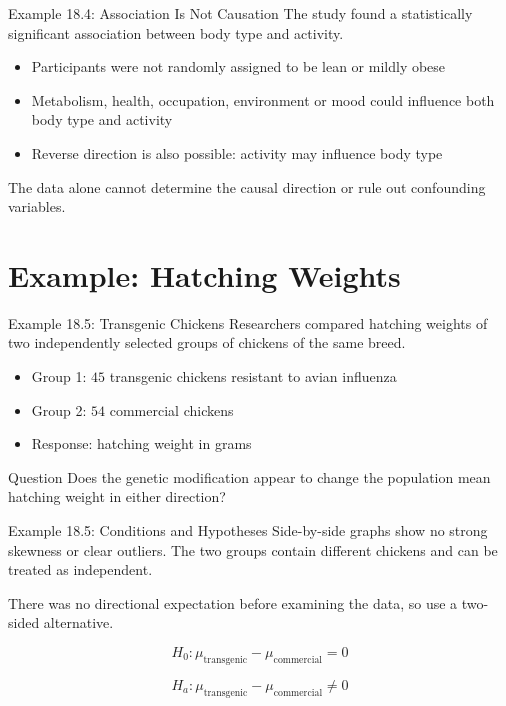 \documentclass[aspectratio=169,10pt]{beamer}
\begin{document}
\begin{frame}{Example 18.4: Association Is Not Causation}
The study found a statistically significant association between body type and activity.

\begin{itemize}
  \item Participants were not randomly assigned to be lean or mildly obese
  \item Metabolism, health, occupation, environment or mood could influence both body type and activity
  \item Reverse direction is also possible: activity may influence body type
\end{itemize}

The data alone cannot determine the causal direction or rule out confounding variables.
\end{frame}


\section{Example: Hatching Weights}

\begin{frame}{Example 18.5: Transgenic Chickens}
Researchers compared hatching weights of two independently selected groups of chickens of the same breed.

\begin{itemize}
  \item Group 1: $45$ transgenic chickens resistant to avian influenza
  \item Group 2: $54$ commercial chickens
  \item Response: hatching weight in grams
\end{itemize}

\begin{block}{Question}
Does the genetic modification appear to change the population mean hatching weight in either direction?
\end{block}
\end{frame}

\begin{frame}{Example 18.5: Conditions and Hypotheses}
Side-by-side graphs show no strong skewness or clear outliers. The two groups contain different chickens and can be treated as independent.

There was no directional expectation before examining the data, so use a two-sided alternative.

\[
H_0:\mu_{\text{transgenic}}-\mu_{\text{commercial}}=0
\]

\[
H_a:\mu_{\text{transgenic}}-\mu_{\text{commercial}}\ne0
\]
\end{frame}
\end{document}
